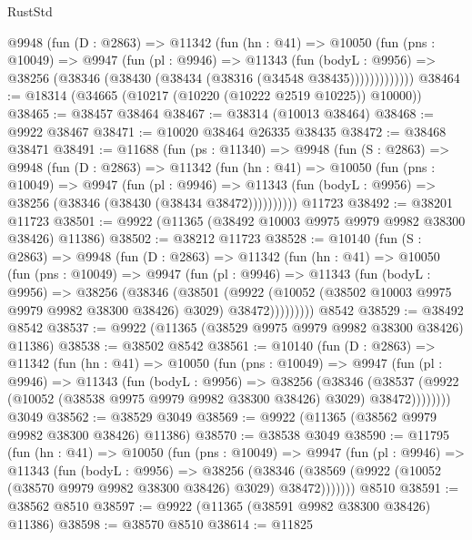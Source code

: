 \begin{lexlean}{RustStd}
\begin{coremodule}
        @9948
          (fun (D : @2863) =>
          @11342
            (fun (hn : @41) =>
            @10050
              (fun (pns : @10049) =>
              @9947
                (fun (pl : @9946) =>
                @11343
                  (fun (bodyL : @9956) =>
                  @38256 (@38346 (@38430 (@38434 (@38316 (@34548 @38435)))))))))))))
@38464 := @18314 (@34665 (@10217 (@10220 (@10222 @2519 @10225)) @10000))
@38465 := @38457 @38464
@38467 := @38314 (@10013 @38464)
@38468 := @9922 @38467
@38471 := @10020 @38464 @26335 @38435
@38472 := @38468 @38471
@38491 := @11688
    (fun (ps : @11340) =>
    @9948
      (fun (S : @2863) =>
      @9948
        (fun (D : @2863) =>
        @11342
          (fun (hn : @41) =>
          @10050
            (fun (pns : @10049) =>
            @9947
              (fun (pl : @9946) =>
              @11343 (fun (bodyL : @9956) => @38256 (@38346 (@38430 (@38434 @38472))))))))))
    @11723
@38492 := @38201 @11723
@38501 := @9922 (@11365 (@38492 @10003 @9975 @9979 @9982 @38300 @38426) @11386)
@38502 := @38212 @11723
@38528 := @10140
    (fun (S : @2863) =>
    @9948
      (fun (D : @2863) =>
      @11342
        (fun (hn : @41) =>
        @10050
          (fun (pns : @10049) =>
          @9947
            (fun (pl : @9946) =>
            @11343
              (fun (bodyL : @9956) =>
              @38256
                (@38346
                  (@38501
                    (@9922
                      (@10052 (@38502 @10003 @9975 @9979 @9982 @38300 @38426) @3029)
                      @38472)))))))))
    @8542
@38529 := @38492 @8542
@38537 := @9922 (@11365 (@38529 @9975 @9979 @9982 @38300 @38426) @11386)
@38538 := @38502 @8542
@38561 := @10140
    (fun (D : @2863) =>
    @11342
      (fun (hn : @41) =>
      @10050
        (fun (pns : @10049) =>
        @9947
          (fun (pl : @9946) =>
          @11343
            (fun (bodyL : @9956) =>
            @38256
              (@38346
                (@38537
                  (@9922 (@10052 (@38538 @9975 @9979 @9982 @38300 @38426) @3029) @38472))))))))
    @3049
@38562 := @38529 @3049
@38569 := @9922 (@11365 (@38562 @9979 @9982 @38300 @38426) @11386)
@38570 := @38538 @3049
@38590 := @11795
    (fun (hn : @41) =>
    @10050
      (fun (pns : @10049) =>
      @9947
        (fun (pl : @9946) =>
        @11343
          (fun (bodyL : @9956) =>
          @38256
            (@38346 (@38569 (@9922 (@10052 (@38570 @9979 @9982 @38300 @38426) @3029) @38472)))))))
    @8510
@38591 := @38562 @8510
@38597 := @9922 (@11365 (@38591 @9982 @38300 @38426) @11386)
@38598 := @38570 @8510
@38614 := @11825

\end{coremodule}
\end{lexlean}
